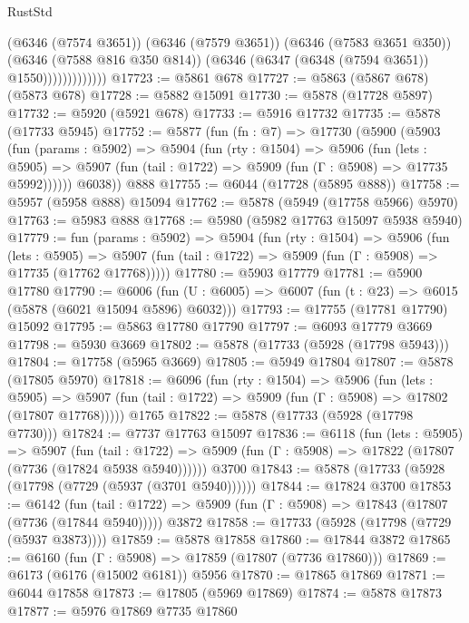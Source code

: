 \begin{lexlean}{RustStd}
\begin{coremodule}
                          (@6346 (@7574 @3651))
                          (@6346 (@7579 @3651))
                          (@6346 (@7583 @3651 @350))
                          (@6346 (@7588 @816 @350 @814))
                          (@6346 (@6347 (@6348 (@7594 @3651)) @1550)))))))))))))
@17723 := @5861 @678
@17727 := @5863 (@5867 @678) (@5873 @678)
@17728 := @5882 @15091
@17730 := @5878 (@17728 @5897)
@17732 := @5920 (@5921 @678)
@17733 := @5916 @17732
@17735 := @5878 (@17733 @5945)
@17752 := @5877
    (fun (fn : @7) =>
    @17730
      (@5900
        (@5903
          (fun (params : @5902) =>
          @5904
            (fun (rty : @1504) =>
            @5906
              (fun (lets : @5905) =>
              @5907 (fun (tail : @1722) => @5909 (fun (Γ : @5908) => @17735 @5992))))))
        @6038))
    @888
@17755 := @6044 (@17728 (@5895 @888))
@17758 := @5957 (@5958 @888) @15094
@17762 := @5878 (@5949 (@17758 @5966) @5970)
@17763 := @5983 @888
@17768 := @5980 (@5982 @17763 @15097 @5938 @5940)
@17779 := fun (params : @5902) =>
  @5904
    (fun (rty : @1504) =>
    @5906
      (fun (lets : @5905) =>
      @5907 (fun (tail : @1722) => @5909 (fun (Γ : @5908) => @17735 (@17762 @17768)))))
@17780 := @5903 @17779
@17781 := @5900 @17780
@17790 := @6006
    (fun (U : @6005) => @6007 (fun (t : @23) => @6015 (@5878 (@6021 @15094 @5896) @6032)))
@17793 := @17755 (@17781 @17790) @15092
@17795 := @5863 @17780 @17790
@17797 := @6093 @17779 @3669
@17798 := @5930 @3669
@17802 := @5878 (@17733 (@5928 (@17798 @5943)))
@17804 := @17758 (@5965 @3669)
@17805 := @5949 @17804
@17807 := @5878 (@17805 @5970)
@17818 := @6096
    (fun (rty : @1504) =>
    @5906
      (fun (lets : @5905) =>
      @5907 (fun (tail : @1722) => @5909 (fun (Γ : @5908) => @17802 (@17807 @17768)))))
    @1765
@17822 := @5878 (@17733 (@5928 (@17798 @7730)))
@17824 := @7737 @17763 @15097
@17836 := @6118
    (fun (lets : @5905) =>
    @5907
      (fun (tail : @1722) =>
      @5909 (fun (Γ : @5908) => @17822 (@17807 (@7736 (@17824 @5938 @5940))))))
    @3700
@17843 := @5878 (@17733 (@5928 (@17798 (@7729 (@5937 (@3701 @5940))))))
@17844 := @17824 @3700
@17853 := @6142
    (fun (tail : @1722) => @5909 (fun (Γ : @5908) => @17843 (@17807 (@7736 (@17844 @5940)))))
    @3872
@17858 := @17733 (@5928 (@17798 (@7729 (@5937 @3873))))
@17859 := @5878 @17858
@17860 := @17844 @3872
@17865 := @6160 (fun (Γ : @5908) => @17859 (@17807 (@7736 @17860)))
@17869 := @6173 (@6176 (@15002 @6181)) @5956
@17870 := @17865 @17869
@17871 := @6044 @17858
@17873 := @17805 (@5969 @17869)
@17874 := @5878 @17873
@17877 := @5976 @17869 @7735 @17860

\end{coremodule}
\end{lexlean}
